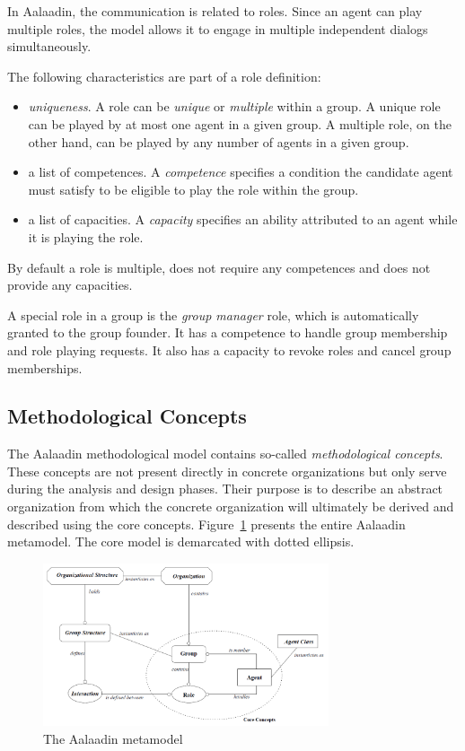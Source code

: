 In Aalaadin, the communication is related to roles. Since an agent can play multiple roles, the model allows it to engage in multiple independent dialogs simultaneously.

The following characteristics are part of a role definition:
\begin{itemize}
	\item \textit{uniqueness}. A role can be \textit{unique} or \textit{multiple} within a group.
	A unique role can be played by at most one agent in a given group.
	A multiple role, on the other hand, can be played by any number of agents in a given group. 
	\item a list of competences. A \textit{competence} specifies a condition the candidate agent must satisfy to be eligible to play the role within the group. 
	\item a list of capacities. A \textit{capacity} specifies an ability attributed to an agent while it is playing the role.
\end{itemize}
By default a role is multiple, does not require any competences and does not provide any capacities.

A special role in a group is the \textit{group manager} role, which is automatically granted to the group founder.
It has a competence to handle group membership and role playing requests.
It also has a capacity to revoke roles and cancel group memberships.

\subsection{Methodological Concepts}

The Aalaadin methodological model contains so-called \textit{methodological concepts}.
These concepts are not present directly in concrete organizations but only serve during the analysis and design phases.
Their purpose is to describe an abstract organization from which the concrete organization will ultimately be derived and described using the core concepts.
Figure~\ref{figure:aalaadin-metamodel} presents the entire Aalaadin metamodel. The core model is demarcated with dotted ellipsis.

\begin{figure}[h]
	\centering
	\includegraphics[width=0.75\textwidth]{images/aalaadin/aalaadin-metamodel.png}
	\caption{The Aalaadin metamodel}
	\label{figure:aalaadin-metamodel}
\end{figure}

